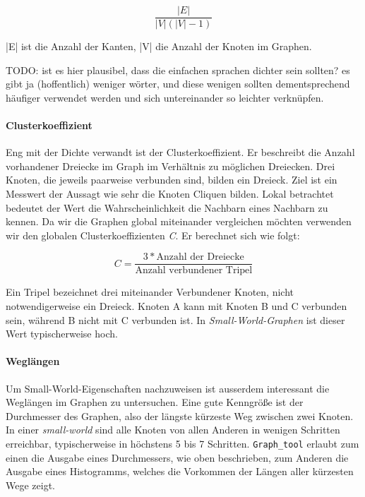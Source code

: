 \documentclass[12pt, a4paper]{article}
\begin{document}
$$
    \frac{|E|}{|V|(|V|-1)}
$$

|E| ist die Anzahl der Kanten, |V| die Anzahl der Knoten im Graphen. 

TODO: ist es hier plausibel, dass die einfachen sprachen dichter sein sollten?
es gibt ja (hoffentlich) weniger wörter, und diese wenigen sollten
dementsprechend häufiger verwendet werden und sich untereinander so leichter
verknüpfen.

\paragraph{Clusterkoeffizient}
Eng mit der Dichte verwandt ist der Clusterkoeffizient. Er beschreibt die
Anzahl vorhandener Dreiecke im Graph im Verhältnis zu möglichen Dreiecken. Drei
Knoten, die jeweils paarweise verbunden sind, bilden ein Dreieck. Ziel ist ein
Messwert der Aussagt wie sehr die Knoten Cliquen bilden. Lokal betrachtet
bedeutet der Wert die Wahrscheinlichkeit die Nachbarn eines Nachbarn zu kennen.
Da wir die Graphen global miteinander vergleichen möchten verwenden wir den
globalen Clusterkoeffizienten \emph{C}. Er berechnet sich wie folgt:

$$
    C = \frac{3*\text{Anzahl der Dreiecke}}{\text{Anzahl verbundener Tripel}}
$$

Ein Tripel bezeichnet drei miteinander Verbundener Knoten, nicht
notwendigerweise ein Dreieck. Knoten A kann mit Knoten B und C verbunden sein,
während B nicht mit C verbunden ist. In \emph{Small-World-Graphen} ist dieser
Wert typischerweise hoch. 




\paragraph{Wegl\"angen}
Um Small-World-Eigenschaften nachzuweisen ist ausserdem interessant die
Weglängen im Graphen zu untersuchen. Eine gute Kenngröße ist der Durchmesser
des Graphen, also der längste kürzeste Weg zwischen zwei Knoten. In einer
\emph{small-world} sind alle Knoten von allen Anderen in wenigen Schritten
erreichbar, typischerweise in höchstens 5 bis 7 Schritten. \texttt{Graph\_tool}
erlaubt zum einen die Ausgabe eines Durchmessers, wie oben beschrieben, zum
Anderen die Ausgabe eines Histogramms, welches die Vorkommen der Längen aller
kürzesten Wege zeigt.
\end{document}
